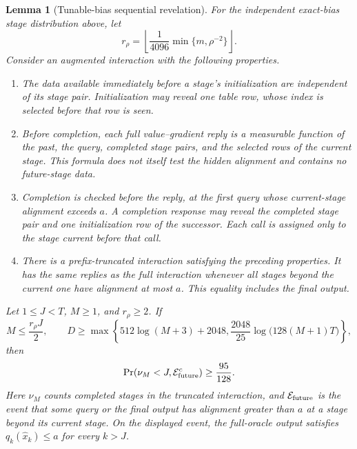 \documentclass[11pt,a4paper]{article}
\newtheorem{lemma}[theorem]{Lemma}
\theoremstyle{remark}
\begin{document}
\begin{lemma}[Tunable-bias sequential revelation]
\label{lem:tunable-sequential-revelation}
For the independent exact-bias stage distribution above, let
\begin{equation}
 r_\rho=
 \left\lfloor\frac1{4096}\min\{m,\rho^{-2}\}\right\rfloor.
 \label{eq:retiring-row-threshold}
\end{equation}
Consider an augmented interaction with the following properties.
\begin{enumerate}
\item The data available immediately before a stage's initialization are
independent of its stage pair.  Initialization may reveal one table row,
whose index is selected before that row is seen.
\item Before completion, each full value--gradient reply is a measurable
function of the past, the query, completed stage pairs, and the selected
rows of the current stage.  This formula does not itself test the hidden
alignment and contains no future-stage data.
\item Completion is checked before the reply, at the first query whose
current-stage alignment exceeds $a$.  A completion response may reveal the
completed stage pair and one initialization row of the successor.  Each
call is assigned only to the stage current before that call.
\item There is a prefix-truncated interaction satisfying the preceding
properties.  It has the same replies as the full interaction whenever all
stages beyond the current one have alignment at most $a$.  This equality
includes the final output.
\end{enumerate}
Let $1\le J<T$, $M\ge1$, and $r_\rho\ge2$.  If
\begin{equation}
 M\le\frac{r_\rho J}{2},\qquad
 D\ge\max\left\{
 512\log(M+3)+2048,
 \frac{2048}{25}\log\bigl(128(M+1)T\bigr)
 \right\},
 \label{eq:imported-sequential-budget}
\end{equation}
then
\begin{equation}
 \Pr(\nu_M<J,\mathcal E_{\rm future}^{c})\ge\frac{95}{128}.
 \label{eq:imported-sequential-probability}
\end{equation}
Here $\nu_M$ counts completed stages in the truncated interaction, and
$\mathcal E_{\rm future}$ is the event that some query or the final output
has alignment greater than $a$ at a stage beyond its current stage.
On the displayed event, the full-oracle output satisfies
$q_k(\widehat x_k)\le a$ for every $k>J$.
\end{lemma}
\end{document}
